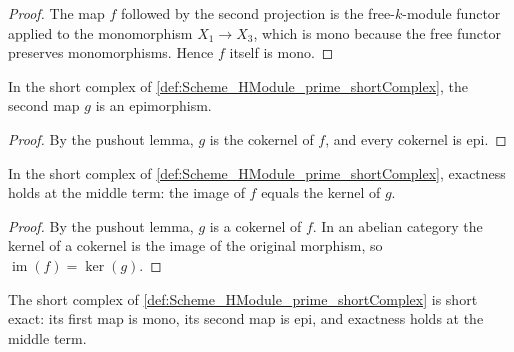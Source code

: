 \begin{proof}
  
  \leanok
  The map \(f\) followed by the second projection is the free-\(k\)-module functor applied to the monomorphism \(X_1 \to X_3\), which is mono because the free functor preserves monomorphisms. Hence \(f\) itself is mono.
\end{proof}

\begin{lemma}\leanok
  \label{lem:Scheme_HModule_prime_shortComplex_g_epi}

  In the short complex of \cref{def:Scheme_HModule_prime_shortComplex}, the second map \(g\) is an epimorphism.
\end{lemma}

\begin{proof}
  
  \leanok
  By the pushout lemma, \(g\) is the cokernel of \(f\), and every cokernel is epi.
\end{proof}

\begin{lemma}\leanok
  \label{lem:Scheme_HModule_prime_shortComplex_exact}

  In the short complex of \cref{def:Scheme_HModule_prime_shortComplex}, exactness holds at the middle term: the image of \(f\) equals the kernel of \(g\).
\end{lemma}

\begin{proof}
  
  \leanok
  By the pushout lemma, \(g\) is a cokernel of \(f\). In an abelian category the kernel of a cokernel is the image of the original morphism, so \(\operatorname{im}(f)=\ker(g)\).
\end{proof}

\begin{lemma}\leanok
  \label{lem:Scheme_HModule_prime_shortComplex_shortExact}

  The short complex of \cref{def:Scheme_HModule_prime_shortComplex} is short exact: its first map is mono, its second map is epi, and exactness holds at the middle term.
\end{lemma}

